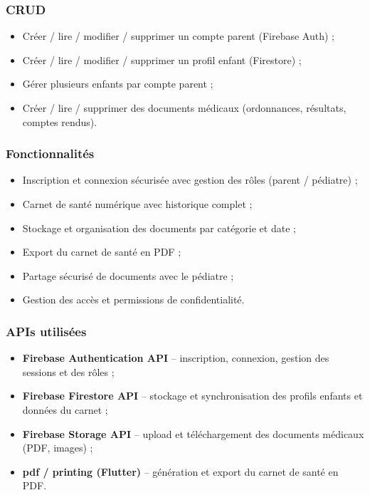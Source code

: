 \documentclass[11pt,a4paper]{article}
\begin{document}
\subsubsection*{CRUD}
\begin{itemize}
  \item Créer / lire / modifier / supprimer un compte parent (Firebase Auth) ;
  \item Créer / lire / modifier / supprimer un profil enfant (Firestore) ;
  \item Gérer plusieurs enfants par compte parent ;
  \item Créer / lire / supprimer des documents médicaux (ordonnances, résultats, comptes rendus).
\end{itemize}

\subsubsection*{Fonctionnalités}
\begin{itemize}
  \item Inscription et connexion sécurisée avec gestion des rôles (parent / pédiatre) ;
  \item Carnet de santé numérique avec historique complet ;
  \item Stockage et organisation des documents par catégorie et date ;
  \item Export du carnet de santé en PDF ;
  \item Partage sécurisé de documents avec le pédiatre ;
  \item Gestion des accès et permissions de confidentialité.
\end{itemize}

\subsubsection*{APIs utilisées}
\begin{itemize}
  \item \textbf{Firebase Authentication API} -- inscription, connexion, gestion des sessions et des rôles ;
  \item \textbf{Firebase Firestore API} -- stockage et synchronisation des profils enfants et données du carnet ;
  \item \textbf{Firebase Storage API} -- upload et téléchargement des documents médicaux (PDF, images) ;
  \item \textbf{pdf / printing (Flutter)} -- génération et export du carnet de santé en PDF.
\end{itemize}
\end{document}
